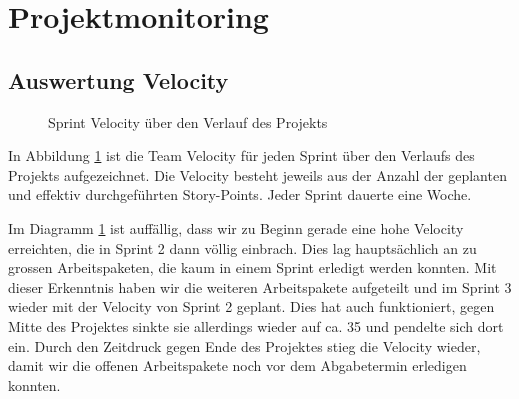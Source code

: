 \section{Projektmonitoring}
\label{sec:Projektmonitoring}

\subsection{Auswertung Velocity}
\label{sub:Auswertung Velocity}

\begin{figure}[H]
    \centering

    \caption[Diagramm Sprint Velocity über das Projekt]{Sprint Velocity über den Verlauf des Projekts}
    \label{chart:sprint_velocity}
\end{figure}

In Abbildung \ref{chart:sprint_velocity} ist die Team Velocity für jeden Sprint über den Verlaufs des Projekts aufgezeichnet. Die Velocity besteht jeweils aus der Anzahl der geplanten und effektiv durchgeführten Story-Points. Jeder Sprint dauerte eine Woche.

Im Diagramm \ref{chart:sprint_velocity} ist auffällig, dass wir zu Beginn gerade eine hohe Velocity erreichten, die in Sprint 2 dann völlig einbrach. Dies lag hauptsächlich an zu grossen Arbeitspaketen, die kaum in einem Sprint erledigt werden konnten. Mit dieser Erkenntnis haben wir die weiteren Arbeitspakete aufgeteilt und im Sprint 3 wieder mit der Velocity von Sprint 2 geplant. Dies hat auch funktioniert, gegen Mitte des Projektes sinkte sie allerdings wieder auf ca. 35 und pendelte sich dort ein. Durch den Zeitdruck gegen Ende des Projektes stieg die Velocity wieder, damit wir die offenen Arbeitspakete noch vor dem Abgabetermin erledigen konnten.


